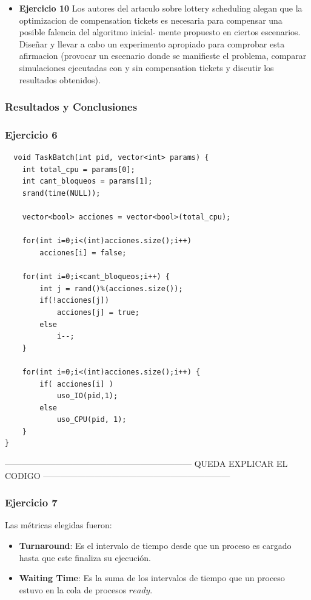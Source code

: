 \begin{itemize}
\item \textbf{Ejercicio 10} Los autores del artıculo sobre lottery scheduling alegan que la optimizacion de
compensation tickets es necesaria para compensar una posible falencia del algoritmo inicial-
mente propuesto en ciertos escenarios. Diseñar y llevar a cabo un experimento apropiado para
comprobar esta afirmacion (provocar un escenario donde se manifieste el problema, comparar
simulaciones ejecutadas con y sin compensation tickets y discutir los resultados obtenidos).

\end{itemize}
\subsubsection{Resultados y Conclusiones}

\subsubsection[]{Ejercicio 6}
 \begin{verbatim}
  void TaskBatch(int pid, vector<int> params) {
	int total_cpu = params[0];
	int cant_bloqueos = params[1];
	srand(time(NULL));
	
	vector<bool> acciones = vector<bool>(total_cpu);
	 
	for(int i=0;i<(int)acciones.size();i++) 
		acciones[i] = false;
		
	for(int i=0;i<cant_bloqueos;i++) {
		int j = rand()%(acciones.size());
		if(!acciones[j])
			acciones[j] = true;
		else
			i--; 
	}

	for(int i=0;i<(int)acciones.size();i++) {
		if( acciones[i] )
			uso_IO(pid,1); 
		else
			uso_CPU(pid, 1); 
	}
}
 \end{verbatim}
 ------------------------------------------------------------------
 QUEDA EXPLICAR EL CODIGO
------------------------------------------------------------------
 \subsubsection[]{Ejercicio 7}
 Las métricas elegidas fueron:
\begin{itemize}
 \item \textbf{Turnaround}: Es el intervalo de tiempo desde que un proceso es cargado hasta que este finaliza su ejecución.
 \item \textbf{Waiting Time}: Es la suma de los intervalos de tiempo que un proceso estuvo en la cola de procesos $ready$.
\end{itemize}

